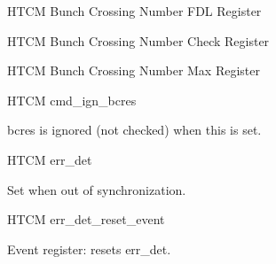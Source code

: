 \begin{register}{H}{TCM Bunch Crossing Number FDL Register}{}%
	\label{tcm_bx_nr_fdl}
	\begin{regdesc}
	\end{regdesc}
\end{register}

\begin{register}{H}{TCM Bunch Crossing Number Check Register}{}%
	\label{tcm_bx_nr_chk}
	\begin{regdesc}
	\end{regdesc}
\end{register}

\begin{register}{H}{TCM Bunch Crossing Number Max Register}{}%
	\label{tcm_bx_nr_max}
	\begin{regdesc}
	\end{regdesc}
\end{register}

\begin{register}{H}{TCM cmd\_ign\_bcres}{}%
	\label{cmd_ign_bcres}%
	\regnewline%
	\begin{regdesc}
	\begin{reglist}
 		\item [cmd\_ign\_bcres] bcres is ignored (not checked) when this is set.
	\end{reglist}
	\end{regdesc}
\end{register}

\begin{register}{H}{TCM err\_det}{}%
	\label{err_det}%
	\regfield{err\_det}{1}{0}{0}%
	\regnewline%
	\begin{regdesc}
	\begin{reglist}
		\item [err\_det] Set when out of synchronization.
	\end{reglist}
	\end{regdesc}
\end{register}

\begin{register}{H}{TCM err\_det\_reset\_event}{}%
	\label{err_det_reset_event}%
	\regnewline%
	\begin{regdesc}
	\begin{reglist}
 		\item [err\_det\_reset\_event] Event register: resets err\_det.
	\end{reglist}
	\end{regdesc}
\end{register}

